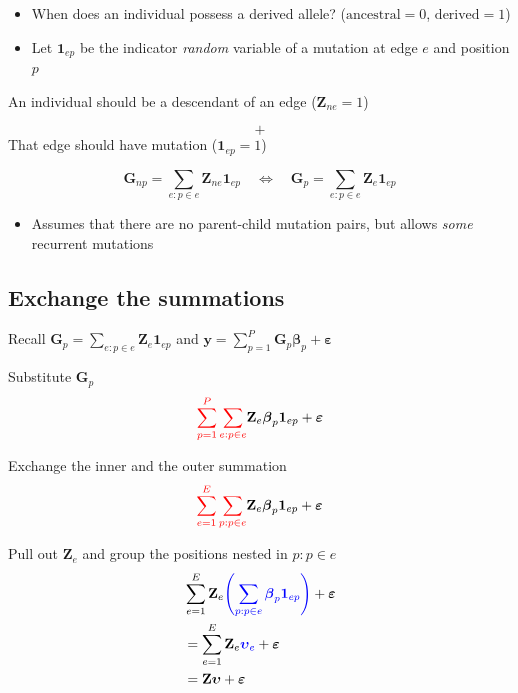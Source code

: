 \documentclass[
  letterpaper,
  DIV=11,
  numbers=noendperiod]{scrartcl}
\providecommand{\tightlist}{%
  \setlength{\itemsep}{0pt}\setlength{\parskip}{0pt}}\usepackage{longtable,booktabs,array}
\begin{document}
\begin{itemize}
\tightlist
\item
  When does an individual possess a derived allele?
  (\(\text{ancestral}=0\), \(\text{derived}=1\))
\item
  Let \(\mathbf{1}_{ep}\) be the indicator \emph{random} variable of a
  mutation at edge \(e\) and position \(p\)
\end{itemize}

An individual should be a descendant of an edge (\(\mathbf{Z}_{ne}=1\))

\[
+
\] That edge should have mutation (\(\mathbf{1}_{ep}=1\))

\[
\mathbf{G}_{np} = \sum_{e: p \in e} \mathbf{Z}_{ne} \mathbf{1}_{ep} \quad \Leftrightarrow \quad \mathbf{G}_p = \sum_{e:p \in e} \mathbf{Z}_{e} \mathbf{1}_{ep}
\]

\begin{itemize}
\tightlist
\item
  Assumes that there are no parent-child mutation pairs, but allows
  \emph{some} recurrent mutations
\end{itemize}

\subsection{Exchange the summations}\label{exchange-the-summations}

Recall
\(\mathbf{G}_p = \sum_{e:p \in e} \mathbf{Z}_{e} \mathbf{1}_{ep}\) and
\(\mathbf{y} = \sum_{p=1}^P \mathbf{G}_p \boldsymbol{\beta}_p + \boldsymbol{\varepsilon}\)

Substitute \(\mathbf{G}_p\) \[
\textcolor{red}{\sum_{p=1}^P \sum_{e:p \in e}} \mathbf{Z}_e \boldsymbol{\beta}_p \mathbf{1}_{ep} + \boldsymbol{\varepsilon}
\]

Exchange the inner and the outer summation \[
\textcolor{red}{\sum_{e=1}^E \sum_{p:p \in e}} \mathbf{Z}_e \boldsymbol{\beta}_p \mathbf{1}_{ep} + \boldsymbol{\varepsilon} 
\]

Pull out \(\mathbf{Z}_e\) and group the positions nested in
\(p: p \in e\) \[
\begin{aligned}
    & \sum_{e=1}^E \mathbf{Z}_e \textcolor{blue}{\left(\sum_{p:p\in e} \boldsymbol{\beta}_p \mathbf{1}_{ep} \right)} + \boldsymbol{\varepsilon} \\
    &= \sum_{e=1}^E \mathbf{Z}_e \textcolor{blue}{\boldsymbol{\upsilon}_e} + \boldsymbol{\varepsilon} \\
    &= \mathbf{Z} \boldsymbol{\upsilon} + \boldsymbol{\varepsilon}
\end{aligned}
\]
\end{document}
